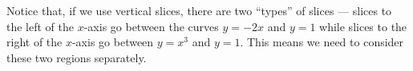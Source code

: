 \documentclass[main]{subfiles}
\begin{document}
\begin{enumerate}
\begin{solution}
\begin{center}
    \end{center}
    Notice that, if we use vertical slices, there are two ``types'' of
    slices --- slices to the left of the $x$-axis go between the curves $y
    = -2x$ and $y = 1$ while slices to the right of the $x$-axis go
    between $y = x^3$ and $y = 1$.  This means we need to consider these
    two regions separately.


\end{solution}
\end{enumerate}
\end{document}
